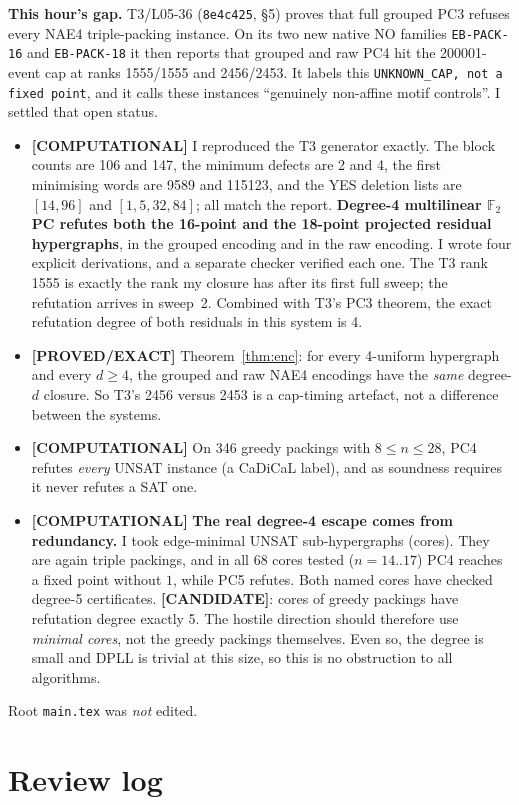 \documentclass[11pt]{article}
\theoremstyle{remark}
\newcommand{\lab}[1]{\textbf{[#1]}}
\newcommand{\F}{\mathbb{F}}
\begin{document}
\textbf{This hour's gap.} T3/L05-36 (\texttt{8e4c425}, \S5) proves that full grouped PC3
refuses every NAE4 triple-packing instance. On its two new native NO families
\texttt{EB-PACK-16} and \texttt{EB-PACK-18} it then reports that grouped and raw PC4 hit the
200001-event cap at ranks 1555/1555 and 2456/2453. It labels this \texttt{UNKNOWN\_CAP, not a
fixed point}, and it calls these instances ``genuinely non-affine motif controls''. I settled
that open status.
\begin{itemize}
\item \lab{COMPUTATIONAL} I reproduced the T3 generator exactly. The block counts are 106 and
147, the minimum defects are 2 and 4, the first minimising words are 9589 and 115123, and the
YES deletion lists are $[14,96]$ and $[1,5,32,84]$; all match the report. \textbf{Degree-4
multilinear $\F_2$ PC refutes both the 16-point and the 18-point projected residual
hypergraphs}, in the grouped encoding and in the raw encoding. I wrote four explicit
derivations, and a separate checker verified each one. The T3 rank 1555 is exactly the rank
my closure has after its first full sweep; the refutation arrives in sweep~2. Combined with
T3's PC3 theorem, the exact refutation degree of both residuals in this system is 4.
\item \lab{PROVED/EXACT} Theorem~\ref{thm:enc}: for every 4-uniform hypergraph and every
$d\ge4$, the grouped and raw NAE4 encodings have the \emph{same} degree-$d$ closure. So T3's
2456 versus 2453 is a cap-timing artefact, not a difference between the systems.
\item \lab{COMPUTATIONAL} On 346 greedy packings with $8\le n\le 28$, PC4 refutes \emph{every}
UNSAT instance (a CaDiCaL label), and as soundness requires it never refutes a SAT one.
\item \lab{COMPUTATIONAL} \textbf{The real degree-4 escape comes from redundancy.} I took
edge-minimal UNSAT sub-hypergraphs (cores). They are again triple packings, and in all 68
cores tested ($n=14..17$) PC4 reaches a fixed point without $1$, while PC5 refutes. Both named
cores have checked degree-5 certificates. \lab{CANDIDATE}: cores of greedy packings have
refutation degree exactly 5. The hostile direction should therefore use \emph{minimal cores},
not the greedy packings themselves. Even so, the degree is small and DPLL is trivial at this
size, so this is no obstruction to all algorithms.
\end{itemize}
Root \texttt{main.tex} was \emph{not} edited.

\section{Review log}
\end{document}

